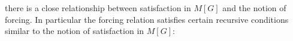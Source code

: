 there is a close relationship between satisfaction in $M[G]$ and the notion of forcing. In particular the forcing relation satisfies certain recursive conditions similar to the notion of satisfaction in $M[G]$:
